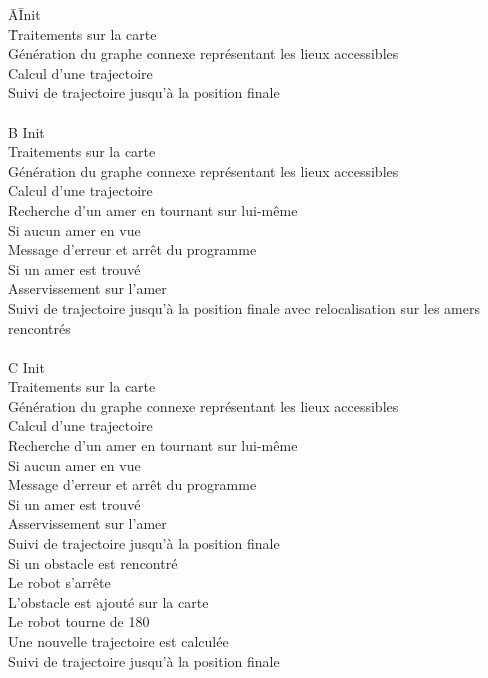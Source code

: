 \documentclass[10pt,a4paper]{article}
\begin{document}
\begin{tabbing}

\hspace{1cm}\=
A\hspace{1cm}\=
Init\\\>\>\hspace{0.6cm}\=
	Traitements sur la carte\\\>\>\>
	Génération du graphe connexe représentant les lieux accessibles\\\>\>\>
	Calcul d'une trajectoire\\\>\>
Suivi de trajectoire jusqu'à la position finale\\\\
\>B\>
Init\\\>\>\>
	Traitements sur la carte\\\>\>\>
	Génération du graphe connexe représentant les lieux accessibles\\\>\>\>
	Calcul d'une trajectoire\\\>\>
Recherche d'un amer en tournant sur lui-même\\\>\>
Si aucun amer en vue\\\>\>\>
	Message d'erreur et arrêt du programme\\\>\>
Si un amer est trouvé\\\>\>\>
	Asservissement sur l'amer\\\>\>
	Suivi de trajectoire jusqu'à la position finale avec relocalisation sur les amers rencontrés\\\\


\>C\>
Init\\\>\>\>
	Traitements sur la carte\\\>\>\>
	Génération du graphe connexe représentant les lieux accessibles\\\>\>\>
	Calcul d'une trajectoire\\\>\>
Recherche d'un amer en tournant sur lui-même\\\>\>
Si aucun amer en vue\\\>\>\>
	Message d'erreur et arrêt du programme\\\>\>
Si un amer est trouvé\\\>\>\>
	Asservissement sur l'amer\\\>\>\>
	Suivi de trajectoire jusqu'à la position finale\\\>\>
Si un obstacle est rencontré\\\>\>\>
	Le robot s'arrête\\\>\>\>
	L'obstacle est ajouté sur la carte\\\>\>\>
	Le robot tourne de 180\degree\\\>\>\>
	Une nouvelle trajectoire est calculée\\\>\>
Suivi de trajectoire jusqu'à la position finale\\\\\\\\



\end{tabbing}
\end{document}
